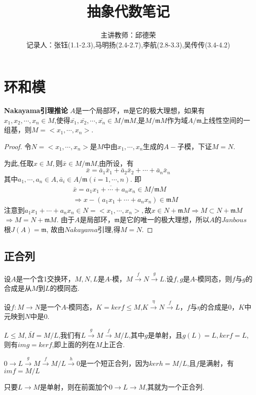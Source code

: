 \documentclass[UTF8]{article}
\title{抽象代数笔记}
\author{主讲教师：邱德荣 \\记录人：张钰(1.1-2.3),马明扬(2.4-2.7),李航(2.8-3.3),吴传传(3.4-4.2)}
\date{}
\begin{document}
\maketitle
\tableofcontents
\newpage
	\section{环和模}
\textbf{Nakayama引理推论}  $A$是一个局部环，$\mathfrak{m}$是它的极大理想，如果有$x_{1},x_{2},\cdots,x_{n}\in M$,使得$\bar{x_{1}},\bar{x_{2}},\cdots,\bar{x_{n}}\in M/\mathfrak{m}M$,是$M/\mathfrak{m}M$作为域$A/\mathfrak{m}$上线性空间的一组基，则$M=<x_{1},\cdots,x_{n}>.$
\begin{proof}
	令$N=<x_{1},\cdots,x_{n}>$是$M$中由$x_{1},\cdots,x_{n}$生成的$A-$子模，下证$M=N$.
	
	为此,任取$x\in M,$则$\bar{x}\in M/\mathfrak{m}M$,由所设，有
	$$
	\bar{x}=\bar{a}_{1}\bar{x}_{1}+\bar{a}_{2}\bar{x}_{2}+\cdots+\bar{a}_{n}\bar{x}_{n}
	$$
	其中$a_{1},\cdots,a_{n}\in A,\bar{a}_{i}\in A/\mathfrak{m}(i=1,\cdots,n).$
	即
	\[
	\begin{split}
	\bar{x}=\overline{a_{1}x_{1}+\cdots+a_{n}x_{n}}\in M/\mathfrak{m}M&\\
	\Rightarrow x-(a_{1}x_{1}+\cdots+a_{n}x_{n})\in \mathfrak{m}M
	\end{split}
	\]
	注意到$a_{1}x_{1}+\cdots+a_{n}x_{n}\in N=<x_{1},\cdots,x_{n}>,$故$x\in N+\mathfrak{m}M\Rightarrow 
	M\subset N+\mathfrak{m}M$ $\Rightarrow M=N+\mathfrak{m}M.$
	由于$A$是局部环，$\mathfrak{m}$是它的唯一的极大理想，所以$A$的$Janbous$根$J(A)=\mathfrak{m}$,
	故由$Nakayama$引理,得$M=N$.
\end{proof}
\subsection{正合列}
设$A$是一个含1交换环，$M,N,L$是$A$-模，$M\xrightarrow{f}N\xrightarrow{g}L$.设$f,g$是$A$-模同态，则$f$与$g$的合成是从$M$到$L$的模同态.

设$f:M\rightarrow N$是一个$A$-模同态，$K=kerf\leqslant M$,$K\xrightarrow{\eta}N\xrightarrow{f}L$，$f$与$\eta$的合成是0，$K$中元映到$N$中是0.

$L\leqslant M,\bar{M}=M/L$,我们有$L\xrightarrow{g}M\xrightarrow{f}M/L$,其中$g$是单射，且$g(L)=L,kerf=L$,则有$img=kerf$,即上面的列在$M$上正合.

$0\rightarrow L\xrightarrow{g}M\xrightarrow{f}M/L\xrightarrow{h}0$是一个短正合列，因为$kerh=M/L$,且$f$是满射，有$imf=M/L$

只要$L\rightarrow M$是单射，则在前面加个$0\rightarrow L\rightarrow M$,其就为一个正合列.
\end{document}
